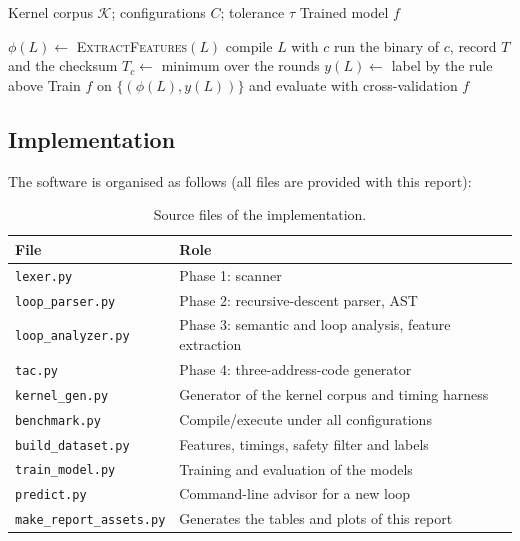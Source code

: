 \begin{algorithm}[H]
\caption{Construction of the Training Set and Model}
\label{alg:training}
\begin{algorithmic}[1]

\Require Kernel corpus $\mathcal{K}$; configurations $C$; tolerance $\tau$
\Ensure Trained model $f$

    \State $\phi(L) \gets$ \textsc{ExtractFeatures}$(L)$
        \State compile $L$ with $c$
    \EndFor
            \State run the binary of $c$, record $T$ and the checksum
        \EndFor
    \EndFor
    \State $T_c \gets$ minimum over the rounds
    \State $y(L) \gets$ label by the rule above
\EndFor
\State Train $f$ on $\{(\phi(L),y(L))\}$ and evaluate with cross-validation
\State \Return $f$

\end{algorithmic}
\end{algorithm}

\subsection{Implementation}

The software is organised as follows (all files are provided with this report):

\begin{table}[H]
\centering
\caption{Source files of the implementation.}
\label{tab:files}
\small
\begin{tabular}{ll}
\toprule
\textbf{File} & \textbf{Role}\\
\midrule
\texttt{lexer.py} & Phase 1: scanner\\
\texttt{loop\_parser.py} & Phase 2: recursive-descent parser, AST\\
\texttt{loop\_analyzer.py} & Phase 3: semantic and loop analysis, feature extraction\\
\texttt{tac.py} & Phase 4: three-address-code generator\\
\texttt{kernel\_gen.py} & Generator of the kernel corpus and timing harness\\
\texttt{benchmark.py} & Compile/execute under all configurations\\
\texttt{build\_dataset.py} & Features, timings, safety filter and labels\\
\texttt{train\_model.py} & Training and evaluation of the models\\
\texttt{predict.py} & Command-line advisor for a new loop\\
\texttt{make\_report\_assets.py} & Generates the tables and plots of this report\\
\bottomrule
\end{tabular}
\end{table}

\newpage
